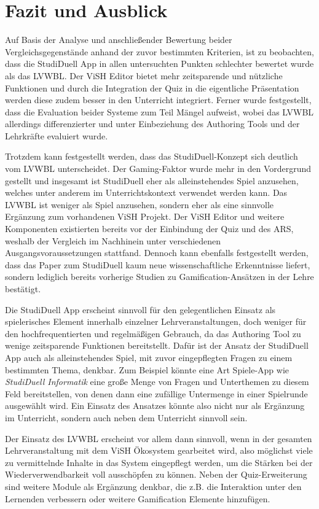 \documentclass[conference]{IEEEtran}
\begin{document}
\section{Fazit und Ausblick}
Auf Basis der Analyse und anschließender Bewertung beider Vergleichsgegenstände anhand der zuvor bestimmten Kriterien, ist zu beobachten, dass die StudiDuell App in allen untersuchten Punkten schlechter bewertet wurde als das LVWBL. Der ViSH Editor bietet mehr zeitsparende und nützliche Funktionen und durch die Integration der Quiz in die eigentliche Präsentation werden diese zudem besser in den Unterricht integriert. Ferner wurde festgestellt, dass die Evaluation beider Systeme zum Teil Mängel aufweist, wobei das LVWBL allerdings differenzierter und unter Einbeziehung des Authoring Tools und der Lehrkräfte evaluiert wurde. 

Trotzdem kann festgestellt werden, dass das StudiDuell-Konzept sich deutlich vom LVWBL unterscheidet. Der Gaming-Faktor wurde mehr in den Vordergrund gestellt und insgesamt ist StudiDuell eher als alleinstehendes Spiel anzusehen, welches unter anderem im Unterrichtskontext verwendet werden kann. Das LVWBL ist weniger als Spiel anzusehen, sondern eher als eine sinnvolle Ergänzung zum vorhandenen ViSH Projekt. Der ViSH Editor und weitere Komponenten existierten bereits vor der Einbindung der Quiz und des ARS, weshalb der Vergleich im Nachhinein unter verschiedenen Ausgangsvoraussetzungen stattfand. Dennoch kann ebenfalls festgestellt werden, dass das Paper zum StudiDuell kaum neue wissenschaftliche Erkenntnisse liefert, sondern lediglich bereits vorherige Studien zu Gamification-Ansätzen in der Lehre bestätigt.

Die StudiDuell App erscheint sinnvoll für den gelegentlichen Einsatz als spielerisches Element innerhalb einzelner Lehrveranstaltungen, doch weniger für den hochfrequentierten und regelmäßigen Gebrauch, da das Authoring Tool zu wenige zeitsparende Funktionen bereitstellt. Dafür ist der Ansatz der StudiDuell App auch als alleinstehendes Spiel, mit zuvor eingepflegten Fragen zu einem bestimmten Thema, denkbar. Zum Beispiel könnte eine Art Spiele-App wie \emph{StudiDuell Informatik} eine große Menge von Fragen und Unterthemen zu diesem Feld bereitstellen, von denen dann eine zufällige Untermenge in einer Spielrunde ausgewählt wird. Ein Einsatz des Ansatzes könnte also nicht nur als Ergänzung im Unterricht, sondern auch neben dem Unterricht sinnvoll sein.

Der Einsatz des LVWBL erscheint vor allem dann sinnvoll, wenn in der gesamten Lehrveranstaltung mit dem ViSH Ökosystem gearbeitet wird, also möglichst viele zu vermittelnde Inhalte in das System eingepflegt werden, um die Stärken bei der Wiederverwendbarkeit voll ausschöpfen zu können. Neben der Quiz-Erweiterung sind weitere Module als Ergänzung denkbar, die z.B. die Interaktion unter den Lernenden verbessern oder weitere Gamification Elemente hinzufügen.
\end{document}
